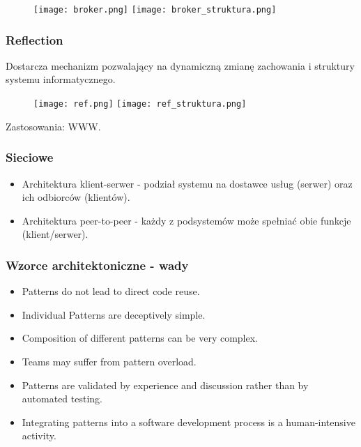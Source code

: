 \documentclass[a4paper]{article}
\begin{document}
\begin{figure}[h]
    \texttt{[image: broker.png]}
    \texttt{[image: broker\_struktura.png]}
\end{figure}

\subsubsection{Reflection}
Dostarcza mechanizm pozwalający na dynamiczną zmianę zachowania
i struktury systemu informatycznego.
\begin{figure}[h]
    \texttt{[image: ref.png]}
    \texttt{[image: ref\_struktura.png]}
\end{figure}

Zastosowania: WWW.

\subsubsection{Sieciowe}
\begin{itemize}
    \item Architektura klient-serwer - podział systemu na dostawce usług (serwer) oraz ich odbiorców (klientów).
    \item Architektura peer-to-peer - każdy z podsystemów może spełniać obie funkcje (klient/serwer).

\end{itemize}

\subsubsection{Wzorce architektoniczne - wady}
    \begin{itemize}
        \item Patterns do not lead to direct code reuse.
        \item Individual Patterns are deceptively simple.
        \item Composition of different patterns can be very complex.
        \item Teams may suffer from pattern overload.
        \item Patterns are validated by experience and discussion
        rather than by automated testing.
        \item Integrating patterns into a software development
        process is a human-intensive activity.
    \end{itemize}
\end{document}
